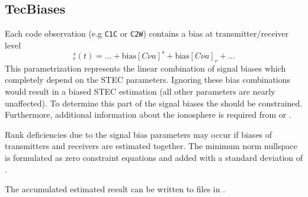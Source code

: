 \subsection{TecBiases}\label{gnssParametrizationType:tecBiases}
Each code observation (e.g \verb|C1C| or \verb|C2W|) contains a bias at transmitter/receiver level
\begin{equation}
  [C\nu a]_r^s(t) = \dots + \text{bias}[C\nu a]^s + \text{bias}[C\nu a]_r + \ldots
\end{equation}
This parametrization represents the linear combination of signal biases
which completely depend on the STEC parameters. Ignoring these bias combinations would result
in a biased STEC estimation (all other parameters are nearly unaffected).
To determine this part of the signal biases
the  should be constrained.
Furthermore, additional information about the ionosphere is required from
 or
.

Rank deficiencies due to the signal bias parameters may occur if biases of
transmitters and receivers are estimated together.
The minimum norm nullspace is formulated as zero constraint equations and added with
a standard deviation of .

The accumulated estimated result can be written to files in
.


